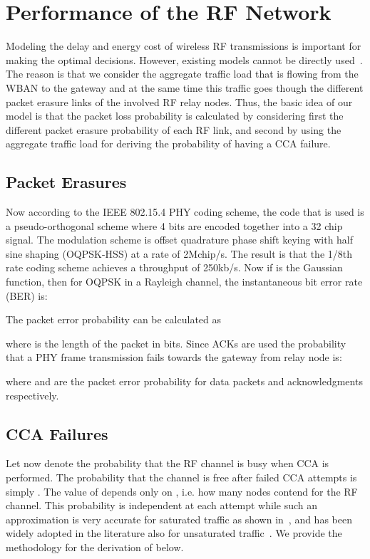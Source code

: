 \documentclass[10pt]{IEEEtran}
\newcounter{section:outage-analysis}
\begin{document}
\section{Performance of the RF Network}
\label{section:rf-radio-model}
Modeling the delay and energy cost of wireless RF transmissions is important for making the optimal decisions. However, existing models cannot be directly used~\cite{kim2008:performance-802154,bianchi-80211,wu02,Miluzzo08radiocharacterization}. The reason is that we consider the aggregate traffic load that is flowing from the WBAN to the gateway and at the same time this traffic goes though the different packet erasure links of the involved RF relay nodes. Thus, the basic idea of our model is that the packet loss probability is calculated by considering first the different packet erasure probability of each RF link, and second by using the aggregate traffic load for deriving the probability of having a CCA failure.

\subsection{Packet Erasures}
\label{section:erasures}
Now according to the IEEE 802.15.4 PHY coding scheme, the code that is used is a pseudo-orthogonal scheme where 4 bits are encoded together into a 32 chip signal.
The modulation scheme is offset quadrature phase shift keying with half sine shaping (OQPSK-HSS) at a rate of 2Mchip/s. The result is that the 1/8th rate coding scheme achieves a throughput of 250kb/s. Now if  is the Gaussian  function, then for OQPSK in a Rayleigh channel, the instantaneous bit error rate (BER) is:

The packet error probability can be calculated as

where  is the length of the packet in bits. Since ACKs are used the probability that a PHY frame transmission fails towards the gateway from relay node  is:

where  and  are the packet error probability for data packets and acknowledgments respectively.

\subsection{CCA Failures}
Let now  denote the probability that the RF channel is busy when CCA is performed. The probability that the channel is free after  failed CCA attempts is simply . The value of  depends only on , i.e. how many nodes contend for the RF channel. This probability is independent at each attempt while such an approximation is very accurate for saturated traffic as shown in~\cite{bianchi-80211}, and has been widely adopted in the literature also for unsaturated traffic~\cite{wu02}. We provide the methodology for the derivation of  below.
\end{document}
